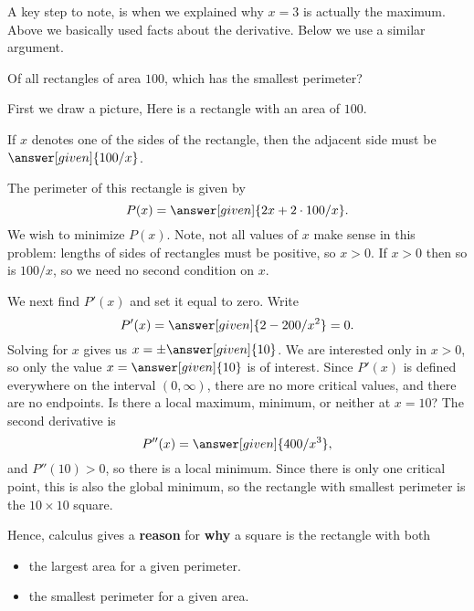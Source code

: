 \documentclass{ximera}
\begin{document}
A key step to note, is when we explained why $x=3$ is actually the
maximum. Above we basically used facts about the derivative. Below we
use a similar argument.



\begin{example}
  Of all rectangles of area $100$, which has the smallest
  perimeter?
\begin{explanation}
  First we draw a picture, Here is a rectangle with an area of $100$.
\begin{image}
\end{image}

If $x$ denotes one of the sides of the rectangle, then the adjacent
side must be $\answer[given]{100/x}$.
 
The perimeter of this rectangle is given by
\[
P(x)=\answer[given]{2x+2\cdot 100/x}.
\]
We wish to minimize $P(x)$.  Note, not all values of $x$ make sense in
this problem: lengths of sides of rectangles must be positive, so
$x>0$. If $x>0$ then so is $100/x$, so we need no second condition on
$x$.

We next find $P'(x)$ and set it equal to zero. Write
\[
P'(x)=\answer[given]{2-200/x^2} = 0.
\]
Solving for $x$ gives us $x=\pm \answer[given]{10}$. We are interested
only in $x>0$, so only the value $x=\answer[given]{10}$ is of
interest. Since $P'(x)$ is defined everywhere on the interval
$(0,\infty)$, there are no more critical values, and there are no
endpoints. Is there a local maximum, minimum, or neither at $x=10$?
The second derivative is
\[
P''(x)=\answer[given]{400/x^3},
\]
and $P''(10)>0$, so there is a local minimum. Since there is only one
critical point, this is also the global minimum, so the rectangle with
smallest perimeter is the $10\times10$  square.
\end{explanation}
\end{example}


Hence, calculus gives a \textbf{reason} for \textbf{why} a square is
the rectangle with both
\begin{itemize}
\item the largest area for a given perimeter.
\item the smallest perimeter for a given area.
\end{itemize}
\end{document}
